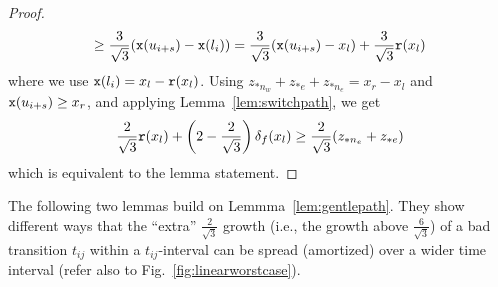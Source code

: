 \begin{proof}
\begin{multline*}
\geq \frac{3}{\sqrt{3}}({\tt x}(u_{i+s})-{\tt x}(l_i)) 
= \frac{3}{\sqrt{3}}({\tt x}(u_{i+s})- x_l) + \frac{3}{\sqrt{3}}{\tt r}(x_l) 
\end{multline*}
where we use ${\tt x}(l_i) = x_l - {\tt r}(x_l)$. Using
$z_{\ast n_w} + z_{\ast e} + z_{\ast n_e} = x_r - x_l$ and ${\tt x}(u_{i+s}) \geq x_r$, and
applying Lemma~\ref{lem:switchpath},
we get 
\[
\frac{2}{\sqrt{3}} {\tt r}(x_l) + \left(2 - \frac{2}{\sqrt{3}}\right)\delta_f(x_l) \geq
\frac{2}{\sqrt{3}}(z_{\ast n_e}+z_{\ast e})
\]
which is equivalent to the lemma statement.
%
\end{proof}

The following two lemmas build on Lemmma~\ref{lem:gentlepath}. They show
different ways that the ``extra'' $\frac{2}{\sqrt{3}}$ growth (i.e., the
growth above $\frac{6}{\sqrt{3}}$) of a bad transition $t_{ij}$ within a
$t_{ij}$-interval can be spread (amortized) over a wider time interval (refer
also to Fig.~\ref{fig:linearworstcase}).

